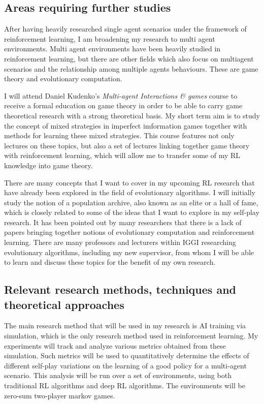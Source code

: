 \documentclass{article}
\begin{document}
\subsection{Areas requiring further studies}
After having heavily researched single agent scenarios under the framework of reinforcement learning, I am broadening my research to multi agent environments. Multi agent environments have been heavily studied in reinforcement learning, but there are other fields which also focus on multiagent scenarios and the relationship among multiple agents behaviours. These are game theory and evolutionary computation.

I will attend Daniel Kudenko's \textit{Multi-agent Interactions \& games} course to receive a formal education on game theory in order to be able to carry game theoretical research with a strong theoretical basis. My short term aim is to study the concept of mixed strategies in imperfect imformation games together with methods for learning these mixed strategies. This course features not only lectures on these topics, but also a set of lectures linking together game theory with reinforcement learning, which will allow me to transfer some of my RL knowledge into game theory.

There are many concepts that I want to cover in my upcoming RL research that have already been explored in the field of evolutionary algorithms. I will initially study the notion of a population archive, also known as an elite or a hall of fame, which is closely related to some of the ideas that I want to explore in my self-play research. It has been pointed out by many researchers that there is a lack of papers bringing together notions of evolutionary computation and reinforcement learning. There are many professors and lecturers within IGGI researching evolutionary algorithms, including my new supervisor, from whom I will be able to learn and discuss these topics for the benefit of my own research. 

\subsection{Relevant research methods, techniques and theoretical approaches}

The main research method that will be used in my research is AI training via simulation, which is the only research method used in reinforcement learning. My experiments will track and analyze various metrics obtained from these simulation. Such metrics will be used to quantitatively determine the effects of different self-play variations on the learning of a good policy for a multi-agent scenario. This analysis will be run over a set of environments, using both traditional RL algorithms and deep RL algorithms. The environments will be zero-sum two-player markov games.
\end{document}
